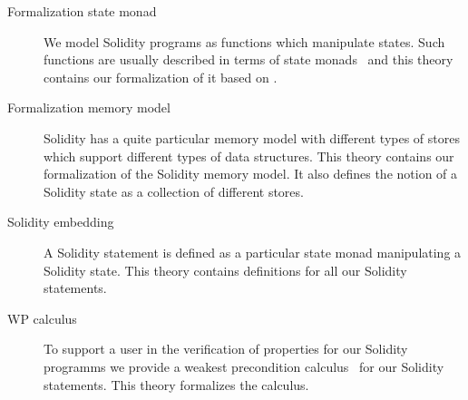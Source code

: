 \documentclass[a4paper,UKenglish,cleveref, autoref, thm-restate]{oasics-v2021}
\begin{document}
\begin{description}
    \item[Formalization state monad]
    We model Solidity programs as functions which manipulate states.
    Such functions are usually described in terms of state monads~\cite{Wadler1993} and this theory contains our formalization of it based on \cite{Cock2008}.
    \item[Formalization memory model]
    Solidity has a quite particular memory model with different types of stores which support different types of data structures.
    This theory contains our formalization of the Solidity memory model.
    It also defines the notion of a Solidity state as a collection of different stores.
    \item[Solidity embedding]
    A Solidity statement is defined as a particular state monad manipulating a Solidity state.
    This theory contains definitions for all our Solidity statements.
    \item[WP calculus]
    To support a user in the verification of properties for our Solidity programms we provide a weakest precondition calculus~\cite{Dijkstra1975} for our Solidity statements.
    This theory formalizes the calculus.
\end{description}
\end{document}
